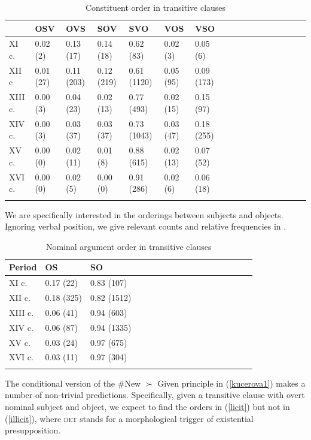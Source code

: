 \documentclass[output=paper,modfonts,nonflat]{langsci/langscibook}
\begin{document}
\begin{table}[H]
\centering
\begin{tabular}{lllllllllllllllll}
  \lsptoprule
 & OSV & OVS & SOV & SVO & VOS & VSO \\ 
  \midrule
XI c. &  0.02 (2) & 0.13 (17) & 0.14 (18) & 0.62 (83) & 0.02 (3) & 0.05 (6) \\ 
  XII c & 0.01 (27) & 0.11 (203) & 0.12 (219) & 0.61 (1120) &  0.05 (95) & 0.09 (173) \\ 
  XIII c. &  0.00 (3) & 0.04 (23) & 0.02 (13) & 0.77 (493) & 0.02 (15) & 0.15 (97) \\ 
  XIV c. &  0.00 (3)  &  0.03 (37) & 0.03 (37) & 0.73 (1043) & 0.03 (47) &0.18 (255) \\ 
  XV c. &  0.00 (0) &  0.02 (11)  &  0.01 (8) & 0.88 (615) & 0.02 (13) & 0.07 (52) \\ 
  XVI c. &  0.00 (0) &  0.02 (5) & 0.00 (0) & 0.91 (286) &  0.02 (6) & 0.06 (18) \\ 
\lspbottomrule
\end{tabular}
\caption{Constituent order in transitive clauses}\label{table:orders}
\end{table}

We are specifically interested in the orderings between subjects and objects. Ignoring verbal position, we give relevant counts and relative frequencies in .

\begin{table}[H]
\centering
\begin{tabular}{lllllllllllllllll}
  \lsptoprule
Period & OS & SO  \\ 
  \midrule
XI c. &  0.17 (22) & 0.83 (107) \\ 
XII c. & 0.18 (325) & 0.82 (1512) \\ 
XIII c. & 0.06 (41)  & 0.94 (603) \\ 
XIV c. & 0.06 (87) & 0.94 (1335) \\ 
XV c. & 0.03 (24) & 0.97 (675) \\ 
XVI c. & 0.03 (11) & 0.97 (304) \\ 
\lspbottomrule
\end{tabular}
\caption{Nominal argument order in transitive clauses}\label{table:orders2}
\end{table}

The conditional version of the \#New $\succ$ Given principle in (\ref{kucerova1}) makes a number of non-trivial predictions. Specifically, given a transitive clause with overt nominal subject and object, we expect to find the orders in (\ref{licit}) but not in (\ref{illicit}), where {\scshape det} stands for a morphological trigger of existential presupposition.
\end{document}
